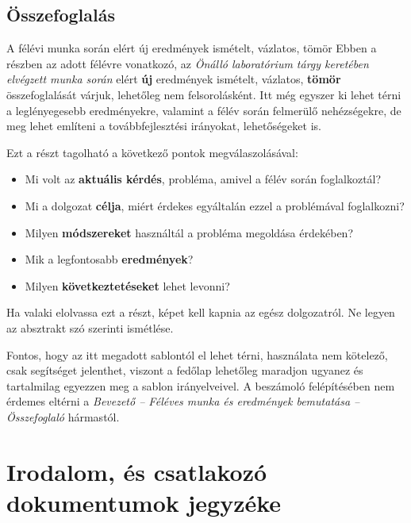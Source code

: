 \documentclass[a4paper,oneside]{article}
\begin{document}
\subsection{Összefoglalás}
\label{sec:osszefoglalas}

A félévi munka során elért új eredmények ismételt, vázlatos, tömör
Ebben a részben az adott félévre vonatkozó, az \emph{Önálló
  laboratórium tárgy keretében elvégzett munka során} elért
\textbf{új} eredmények ismételt, vázlatos, \textbf{tömör}
összefoglalását várjuk, lehetőleg nem felsorolásként.  Itt még egyszer
ki lehet térni a leglényegesebb eredményekre, valamint a félév során
felmerülő nehézségekre, de meg lehet említeni a továbbfejlesztési
irányokat, lehetőségeket is.

Ezt a részt tagolható a következő pontok megválaszolásával:
\begin{itemize}
\item Mi volt az \textbf{aktuális kérdés}, probléma, amivel a félév
  során foglalkoztál?
\item Mi a dolgozat \textbf{célja}, miért érdekes egyáltalán ezzel a
  problémával foglalkozni?
\item Milyen \textbf{módszereket} használtál a probléma megoldása
  érdekében?
\item Mik a legfontosabb \textbf{eredmények}?
\item Milyen \textbf{következtetéseket} lehet levonni?

\end{itemize}

Ha valaki elolvassa ezt a részt, képet kell kapnia az egész
dolgozatról.  Ne legyen az absztrakt szó szerinti ismétlése.

Fontos, hogy az itt megadott sablontól el lehet térni, használata nem
kötelező, csak segítséget jelenthet, viszont a fedőlap lehetőleg
maradjon ugyanez és tartalmilag egyezzen meg a sablon irányelveivel. A
beszámoló felépítésében nem érdemes eltérni a \emph{Bevezető --
  Féléves munka és eredmények bemutatása -- Összefoglaló} hármastól.

\newpage

\section{Irodalom, és csatlakozó dokumentumok jegyzéke}
\label{sec:irod-es-csatl}
\end{document}
